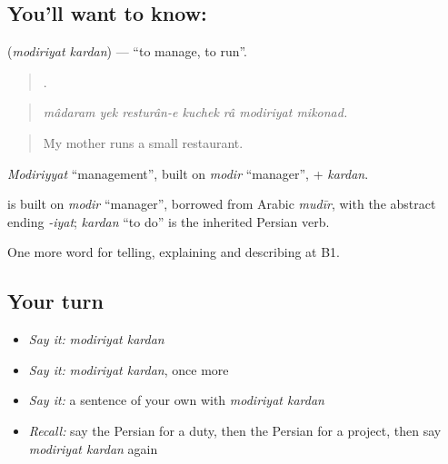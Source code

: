\subsection*{You'll want to know:  }
\textbf{ } (\emph{modiriyat kardan}) — \textquotedblleft{}to manage, to run\textquotedblright{}.

\begin{quote}
      .
\end{quote}

\begin{quote}
\emph{mâdaram yek resturân-e kuchek râ modiriyat mikonad.}
\end{quote}

\begin{quote}
My mother runs a small restaurant.
\end{quote}

\emph{Modiriyyat} \textquotedblleft{}management\textquotedblright{}, built on \emph{modir} \textquotedblleft{}manager\textquotedblright{}, + \emph{kardan}.

\begin{cousinweb}
\textbf{} is built on \emph{modir} \textquotedblleft{}manager\textquotedblright{}, borrowed from Arabic \emph{mudīr}, with the abstract ending \emph{-iyat}; \emph{kardan} \textquotedblleft{}to do\textquotedblright{} is the inherited Persian verb.
\end{cousinweb}

\begin{grammarlens}[title={What you've built}]
One more word for telling, explaining and describing at B1.
\end{grammarlens}

\subsection*{Your turn}
\begin{itemize}
\raggedright
  \item \emph{Say it:} \emph{modiriyat kardan}
  \item \emph{Say it:} \emph{modiriyat kardan}, once more
  \item \emph{Say it:} a sentence of your own with \emph{modiriyat kardan}
  \item \emph{Recall:} say the Persian for a duty, then the Persian for a project, then say \emph{modiriyat kardan} again
\end{itemize}

